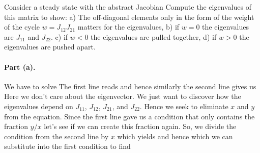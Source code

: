 Consider a steady state with the abstract Jacobian
Compute the eigenvalues of this matrix to show: a) The off-diagonal elements only in the form of  the weight of the cycle $w=J_{12}J_{21}$ matters for the eigenvalues, b) if $w=0$ the eigenvalues are $J_{11}$ and $J_{22}$. c) if $w<0$ the eigenvalues are pulled together, d) if $w>0$ the eigenvalues are pushed apart.   

\solution
\paragraph{Part (a).}We have to solve 
The first line reads 
and hence 
similarly the second line gives us 
Here we don't care about the eigenvector. We just want to discover how the eigenvalues depend on $J_{11}$, $J_{12}$, $J_{21}$, and $J_{22}$. Hence we seek to eliminate $x$ and $y$ from the equation. Since the first line gave us a condition that only contains the fraction $y/x$ let's see if we can create this fraction again. So, we divide the condition from the second line by $x$ which yields 
and hence 
which we can substitute into the first condition to find 
